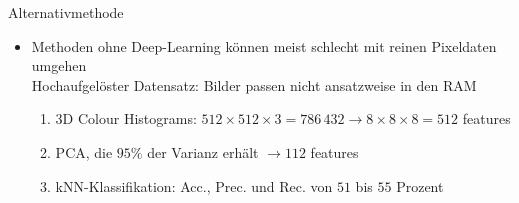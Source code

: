 \documentclass[aspectratio=1610, 9pt]{beamer}
\begin{document}
\begin{frame}{Alternativmethode}

  \begin{itemize}
    \item Methoden ohne Deep-Learning können meist schlecht mit reinen Pixeldaten umgehen\\
    \rightarrow{} Hochaufgelöster Datensatz: Bilder passen nicht ansatzweise in den RAM
    \begin{enumerate}
      \item 3D Colour Histograms: $512\times512\times3=786\,432 \to 8\times8\times8=512$ features
      \item PCA, die $95\%$ der Varianz erhält $\to 112$ features
      \item kNN-Klassifikation: Acc., Prec. und Rec. von $51$ bis $55$ Prozent
    \end{enumerate}
  \end{itemize}

  \begin{figure}
	   \centering
	   \hspace{1cm}
  \end{figure}

\end{frame}
\end{document}
